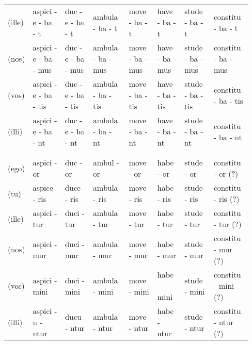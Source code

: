 \documentclass[a4paper, landscape]{article}
\begin{document}
\begin{landscape}
\begin{table}[]
\begin{tabular}{llllllll}
	(ille)	& aspici - e - ba - t		& duc - e - ba - t		& ambula - ba - t	& move - ba - t		& have - ba - t		& stude - ba - t 	& constitu - ba - t \\
	(nos)	& aspici - e - ba - mus		& duc - e - ba - mus	& ambula - ba - mus & move - ba - mus	& have - ba - mus	& stude - ba - mus  & constitu - ba - mus \\
	(vos)	& aspici - e - ba - tis		& duc - e - ba - tis	& ambula - ba - tis	& move - ba - tis	& have - ba - tis 	& stude - ba - tis  & constitu - ba - tis  \\
	(illi)	& aspici - e - ba - nt		& duc - e - ba - nt 	& ambula - ba - nt	& move - ba - nt 	& have - ba - nt	& stude - ba - nt	& constitu - ba - nt \\
	& & & &  &  &  & \\
	& & & &  &  &  & \\
	(ego)   & aspici - or		& duc  - or		& ambul - or	& move - or   & habe - or   & stude - or  & constitu - or (?)\\
	(tu)	& aspice - ris		& duce - ris	& ambula - ris	& move - ris  & habe - ris  & stude - ris & constitu - ris (?)\\
	(ille)	& aspici - tur		& duci - tur	& ambula - tur	& move - tur  & habe - tur  & stude - tur & constitu - tur (?)\\
	(nos)	& aspici - mur		& duci - mur	& ambula - mur	& move - mur  & habe - mur  & stude - mur & constitu - mur (?)\\
	(vos)	& aspici - mini		& duci - mini	& ambula - mini & move - mini & habe - mini & stude - mini & constitu - mini (?)\\
	(illi)	& aspici - u - ntur & ducu - ntur 	& ambula - ntur & move - ntur & habe - ntur & stude - ntur & constitu - ntur (?)\\


\end{tabular}
\end{table}


\end{landscape}
\end{document}
